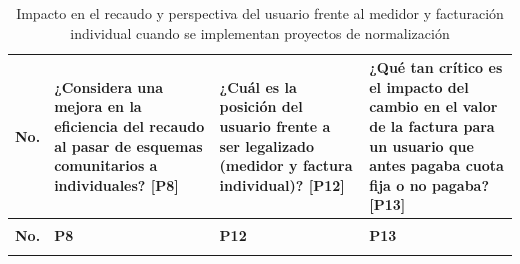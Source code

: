 \begin{longtable}{>{\centering}p{0.7cm}
                  >{\RaggedRight}p{4.5cm}
                  >{\RaggedRight}p{4.5cm}
                  >{\RaggedRight\arraybackslash}p{4.5cm}}
\caption{Impacto en el recaudo y perspectiva del usuario frente al medidor y facturación individual cuando se implementan proyectos de normalización}
\label{tab:encuesta_recaudo} \\
\toprule
\textbf{No.} &
\textbf{¿Considera una mejora en la eficiencia del recaudo al pasar de esquemas comunitarios a individuales? [P8]} &
\textbf{¿Cuál es la posición del usuario frente a ser legalizado (medidor y factura individual)? [P12]} &
\textbf{¿Qué tan crítico es el impacto del cambio en el valor de la factura para un usuario que antes pagaba cuota fija o no pagaba? [P13]} \\
\midrule
\endfirsthead
\multicolumn{4}{c}{\small(Continuación Tabla \ref{tab:encuesta_recaudo})} \\
\toprule
\textbf{No.} & \textbf{P8} & \textbf{P12} & \textbf{P13} \\
\midrule
\endhead
\bottomrule
\endfoot
\bottomrule
\endlastfoot


\end{longtable}
